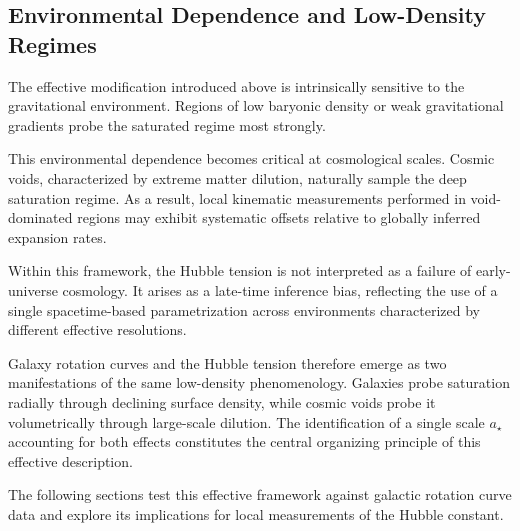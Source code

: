 \subsection{Environmental Dependence and Low-Density Regimes}
  \label{subsec:environment}

  The effective modification introduced above is intrinsically sensitive to the
  gravitational environment.
  Regions of low baryonic density or weak gravitational gradients
  probe the saturated regime most strongly.

  This environmental dependence becomes critical at cosmological scales.
  Cosmic voids, characterized by extreme matter dilution,
  naturally sample the deep saturation regime.
  As a result, local kinematic measurements performed in void-dominated regions
  may exhibit systematic offsets relative to globally inferred expansion rates.

  Within this framework, the Hubble tension is not interpreted
  as a failure of early-universe cosmology.
  It arises as a late-time inference bias,
  reflecting the use of a single spacetime-based parametrization
  across environments characterized by different effective resolutions.

  Galaxy rotation curves and the Hubble tension therefore emerge
  as two manifestations of the same low-density phenomenology.
  Galaxies probe saturation radially through declining surface density,
  while cosmic voids probe it volumetrically through large-scale dilution.
  The identification of a single scale $a_\star$
  accounting for both effects constitutes the central organizing principle of this effective description.

  The following sections test this effective framework
  against galactic rotation curve data
  and explore its implications for local measurements
  of the Hubble constant.
